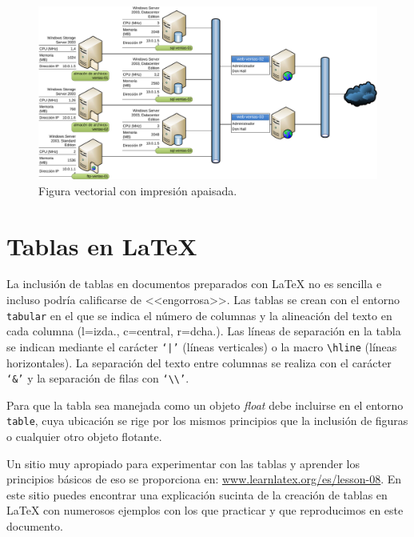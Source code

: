 \documentclass[ 		%
	11pt,				%
	a4paper,			%
	twoside,			%
	openright,			%
	final       		%
]{book}
\begin{document}
\begin{figure}
	\centering
	\includegraphics[width=0.98\textheight]{network} 
	\caption[Gráfico de apaisado Visio]{Figura vectorial con impresión apaisada.}
	\label{fig:sideways}
\end{figure}






\chapter{Tablas en \LaTeX{}}
La inclusión de tablas en documentos preparados con \LaTeX{} no es sencilla e incluso podría calificarse de <<engorrosa>>. Las tablas se crean con el entorno \texttt{tabular} en el que se indica el número de columnas y la alineación del texto en cada columna (l=izda., c=central, r=dcha.). Las líneas de separación en la tabla se indican mediante el carácter \texttt{`|'} (líneas verticales) o la macro \texttt{\textbackslash hline} (líneas horizontales). La separación del texto entre columnas se realiza con el carácter \texttt{`\&'} y la separación de filas con \texttt{`\textbackslash\textbackslash'}.

Para que la tabla sea manejada como un objeto \emph{float} debe incluirse en el entorno \texttt{table}, cuya ubicación se rige por los mismos principios que la inclusión de figuras o cualquier otro objeto flotante.

Un sitio muy apropiado para experimentar con las tablas y aprender los principios básicos de eso se proporciona en: \url{www.learnlatex.org/es/lesson-08}. En este sitio puedes encontrar una explicación sucinta de la creación de tablas en \LaTeX{} con numerosos ejemplos con los que practicar y que reproducimos en este documento.
\end{document}
